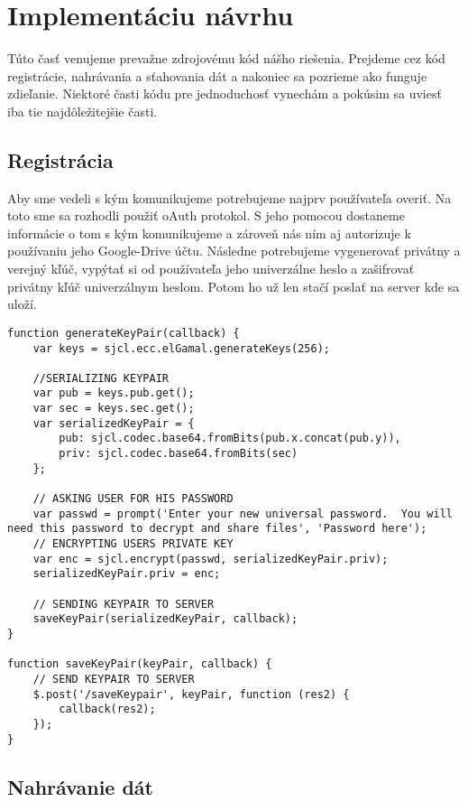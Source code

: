 \section{Implementáciu návrhu}
	Túto časť venujeme prevažne zdrojovému kód nášho riešenia. Prejdeme cez kód registrácie, nahrávania a sťahovania dát a nakoniec sa pozrieme ako funguje zdieľanie. Niektoré časti kódu pre jednoduchosť vynechám a pokúsim sa uviesť iba tie najdôležitejšie časti. 
	
	\subsection{Registrácia}
	
		Aby sme vedeli s kým komunikujeme potrebujeme najprv používateľa overiť. Na toto sme sa rozhodli použiť oAuth protokol. S jeho pomocou dostaneme informácie o tom s kým komunikujeme a zároveň nás ním aj autorizuje k používaniu jeho Google-Drive účtu. Následne potrebujeme vygenerovať privátny a verejný kľúč, vypýtať si od používateľa jeho univerzálne heslo a zašifrovať privátny kľúč univerzálnym heslom. Potom ho už len stačí poslať na server kde sa uloží. 
		
\medskip
\begin{lstlisting}[caption=Generovanie kľúčového páru a odoslanie na server]
function generateKeyPair(callback) {
    var keys = sjcl.ecc.elGamal.generateKeys(256);

    //SERIALIZING KEYPAIR
    var pub = keys.pub.get();
    var sec = keys.sec.get();
    var serializedKeyPair = {
        pub: sjcl.codec.base64.fromBits(pub.x.concat(pub.y)),
        priv: sjcl.codec.base64.fromBits(sec)
    };

    // ASKING USER FOR HIS PASSWORD
    var passwd = prompt('Enter your new universal password.  You will need this password to decrypt and share files', 'Password here');
    // ENCRYPTING USERS PRIVATE KEY
    var enc = sjcl.encrypt(passwd, serializedKeyPair.priv);
    serializedKeyPair.priv = enc;

    // SENDING KEYPAIR TO SERVER
    saveKeyPair(serializedKeyPair, callback);
}

function saveKeyPair(keyPair, callback) {
    // SEND KEYPAIR TO SERVER
    $.post('/saveKeypair', keyPair, function (res2) {
        callback(res2);
    });
}
\end{lstlisting}


	\subsection{Nahrávanie dát}	
	

